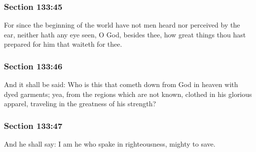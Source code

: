 	\subsubsection{Section 133:45} %
		\label{DC133-45}

		For since the beginning of the world have not men heard nor perceived by the ear, neither hath any eye seen, O God, besides thee, how great things thou hast prepared for him that waiteth for thee.


	\subsubsection{Section 133:46} %
		\label{DC133-46}

		And it shall be said: Who is this that cometh down from God in heaven with dyed garments; yea, from the regions which are not known, clothed in his glorious apparel, traveling in the greatness of his strength?


	\subsubsection{Section 133:47} %
		\label{DC133-47}

		And he shall say: I am he who spake in righteousness, mighty to save.


